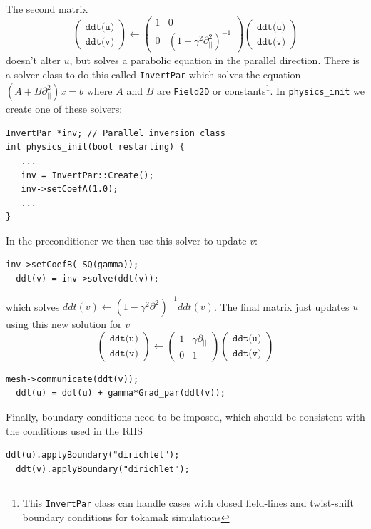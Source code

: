 \documentclass[12pt]{article}
\begin{document}
The second matrix
\[
\left(\begin{array}{c}
\texttt{ddt(u)} \\
\texttt{ddt(v)}
\end{array}\right) \leftarrow \left(\begin{array}{cc}
1 & 0 \\
0 & \left(1 - \gamma^2\partial^2_{||}\right)^{-1}
\end{array}\right)\left(\begin{array}{c}
\texttt{ddt(u)} \\
\texttt{ddt(v)}
\end{array}\right)
\]
doesn't alter $u$, but solves a parabolic equation in the parallel direction. There is a solver class to do this
called \texttt{InvertPar} which solves the equation $\left(A + B\partial_{||}^2\right)x = b$ where $A$ and $B$ are
\lstinline!Field2D! or constants\footnote{This \texttt{InvertPar} class can handle cases with closed field-lines and twist-shift boundary conditions for tokamak simulations}. In \lstinline!physics_init! we create one of these solvers:
\begin{lstlisting}[numbers=none]
InvertPar *inv; // Parallel inversion class
int physics_init(bool restarting) {
   ...
   inv = InvertPar::Create();
   inv->setCoefA(1.0);
   ...
}
\end{lstlisting}
In the preconditioner we then use this solver to update $v$:
\begin{lstlisting}[numbers=none]
  inv->setCoefB(-SQ(gamma));
  ddt(v) = inv->solve(ddt(v));
\end{lstlisting}
which solves $ddt(v) \leftarrow \left(1 - \gamma^2\partial_{||}^2\right)^{-1} ddt(v)$.
The final matrix just updates $u$ using this new solution for $v$
\[
\left(\begin{array}{c}
\texttt{ddt(u)} \\
\texttt{ddt(v)}
\end{array}\right) \leftarrow \left(\begin{array}{cc}
1 & \gamma\partial_{||} \\
0 & 1
\end{array}\right)\left(\begin{array}{c}
\texttt{ddt(u)} \\
\texttt{ddt(v)}
\end{array}\right)
\]
\begin{lstlisting}[numbers=none]
  mesh->communicate(ddt(v));
  ddt(u) = ddt(u) + gamma*Grad_par(ddt(v));
\end{lstlisting}
Finally, boundary conditions need to be imposed, which should be consistent with the conditions used in the RHS
\begin{lstlisting}[numbers=none]
  ddt(u).applyBoundary("dirichlet");
  ddt(v).applyBoundary("dirichlet");
\end{lstlisting}
\end{document}
